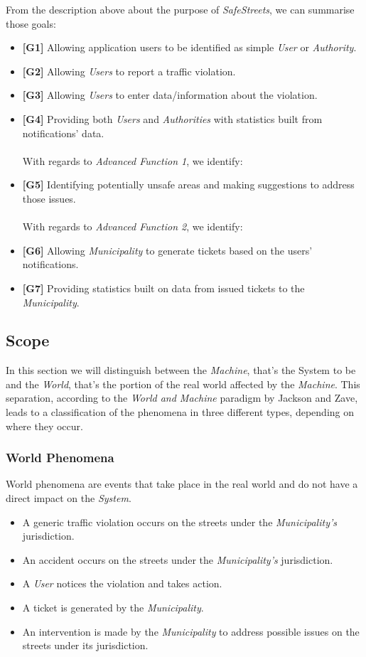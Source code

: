 \documentclass {article}
\begin{document}
	From the description above about the purpose of {\it SafeStreets}, we can summarise those goals:
		\begin{itemize}
			 \item {\bf [G1]} Allowing application users to be identified as simple {\it User} or {\it Authority}.
   			 \item {\bf [G2]} Allowing {\it Users} to report a traffic violation.		
			 \item {\bf [G3]} Allowing {\it Users} to enter data/information about the violation.
   			 \item {\bf [G4]} Providing both {\it Users} and {\it Authorities} with statistics built from notifications’ data.    			  
   			 \\
			 \\
With regards to {\it {\it Advanced Function 1}}, we identify: 
   			 \item {\bf [G5]} Identifying potentially unsafe areas and making suggestions to address those issues.
   			 \\
			 \\
 With regards to {\it Advanced Function 2}, we identify:
			  \item {\bf [G6]} Allowing {\it Municipality} to generate tickets based on the users’ notifications. 
			  \item {\bf [G7]} Providing statistics built on data from issued tickets to the {\it Municipality}.		
			  \end{itemize}
			
	\subsection{Scope}
	In this section we will distinguish between the {\it Machine}, that's the System to be and the {\it World}, that's the portion of the real world affected by the {\it Machine}. This separation, according to the {\it World and Machine} paradigm by Jackson and Zave, leads to a classification of the phenomena in three different types, depending on where they occur. 		
		\subsubsection{World Phenomena}
		World phenomena are events that take place in the real world and do not have a direct impact on the {\it System}. 
		\begin{itemize}
			\item A generic traffic violation occurs on the streets under the {\it Municipality's} jurisdiction. 
			\item An accident occurs on the streets under the {\it Municipality's} jurisdiction.
			\item A {\it User} notices the violation and takes action.
			\item A ticket is generated by the {\it Municipality}.
			\item An intervention is made by the {\it Municipality} to address possible issues on the streets under its jurisdiction.
		\end{itemize}
\end{document}

